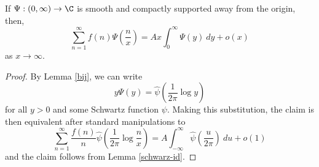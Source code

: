 \begin{corollary}
\label{WienerIkeharaSmooth}
\leanok
If $\Psi: (0,\infty) \to \C$ is smooth and compactly supported away from the origin, then,
  $$ \sum_{n=1}^\infty f(n) \Psi( \frac{n}{x} ) = A x \int_0^\infty \Psi(y)\ dy + o(x)$$
  as $x \to \infty$.
\end{corollary}
\begin{proof}
\leanok
By Lemma \ref{bij}, we can write
  $$ y \Psi(y) = \hat \psi( \frac{1}{2\pi} \log y )$$
  for all $y>0$ and some Schwartz function $\psi$.  Making this substitution, the claim is then
  equivalent after standard manipulations to
  $$ \sum_{n=1}^\infty \frac{f(n)}{n} \hat \psi( \frac{1}{2\pi} \log \frac{n}{x} )
    = A \int_{-\infty}^\infty \hat \psi(\frac{u}{2\pi})\ du + o(1)$$
  and the claim follows from Lemma \ref{schwarz-id}.
\end{proof}
